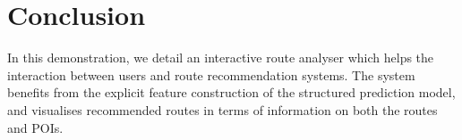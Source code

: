 \section{Conclusion}
In this demonstration, we detail an interactive route analyser which helps the interaction between users and route recommendation systems. 
The system benefits from the explicit feature construction of the structured prediction model, and visualises recommended routes in terms of information on both the routes and POIs.
